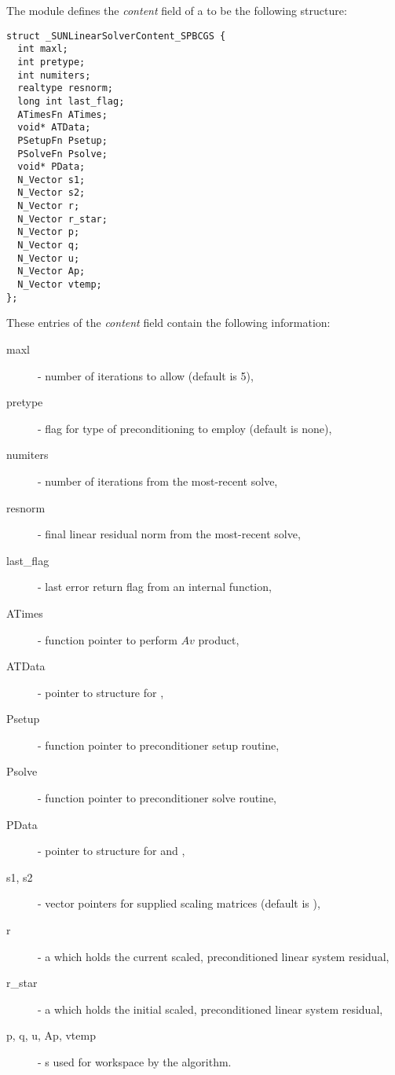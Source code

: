 The {\sunlinsolspbcgs} module defines the {\em content} field of a
 to be the following structure:
\begin{verbatim}
struct _SUNLinearSolverContent_SPBCGS {
  int maxl;
  int pretype;
  int numiters;
  realtype resnorm;
  long int last_flag;
  ATimesFn ATimes;
  void* ATData;
  PSetupFn Psetup;
  PSolveFn Psolve;
  void* PData;
  N_Vector s1;
  N_Vector s2;
  N_Vector r;
  N_Vector r_star;
  N_Vector p;
  N_Vector q;
  N_Vector u;
  N_Vector Ap;
  N_Vector vtemp;
};
\end{verbatim}
These entries of the \emph{content} field contain the following
information:
\begin{description}
  \item[maxl] - number of {\spbcg} iterations to allow (default is 5),
  \item[pretype] - flag for type of preconditioning to employ
    (default is none),
  \item[numiters] - number of iterations from the most-recent solve,
  \item[resnorm] - final linear residual norm from the most-recent solve,
  \item[last\_flag] - last error return flag from an internal function,
  \item[ATimes] - function pointer to perform $Av$ product,
  \item[ATData] - pointer to structure for ,
  \item[Psetup] - function pointer to preconditioner setup routine,
  \item[Psolve] - function pointer to preconditioner solve routine,
  \item[PData] - pointer to structure for  and ,
  \item[s1, s2] - vector pointers for supplied scaling matrices
    (default is ),
  \item[r] - a {\nvector} which holds the current scaled,
    preconditioned linear system residual,
  \item[r\_star] - a {\nvector} which holds the initial scaled,
    preconditioned linear system residual,
  \item[p, q, u, Ap, vtemp] - {\nvector}s used for workspace by the
    {\spbcg} algorithm.
\end{description}

